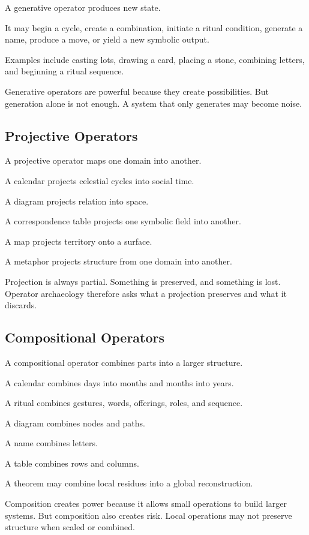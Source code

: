\documentclass[11pt]{book}
\begin{document}
A generative operator produces new state.

It may begin a cycle, create a combination, initiate a ritual condition, generate a name, produce a move, or yield a new symbolic output.

Examples include casting lots, drawing a card, placing a stone, combining letters, and beginning a ritual sequence.

Generative operators are powerful because they create possibilities. But generation alone is not enough. A system that only generates may become noise.

\subsection{Projective Operators}

A projective operator maps one domain into another.

A calendar projects celestial cycles into social time.

A diagram projects relation into space.

A correspondence table projects one symbolic field into another.

A map projects territory onto a surface.

A metaphor projects structure from one domain into another.

Projection is always partial. Something is preserved, and something is lost. Operator archaeology therefore asks what a projection preserves and what it discards.

\subsection{Compositional Operators}

A compositional operator combines parts into a larger structure.

A calendar combines days into months and months into years.

A ritual combines gestures, words, offerings, roles, and sequence.

A diagram combines nodes and paths.

A name combines letters.

A table combines rows and columns.

A theorem may combine local residues into a global reconstruction.

Composition creates power because it allows small operations to build larger systems. But composition also creates risk. Local operations may not preserve structure when scaled or combined.
\end{document}
